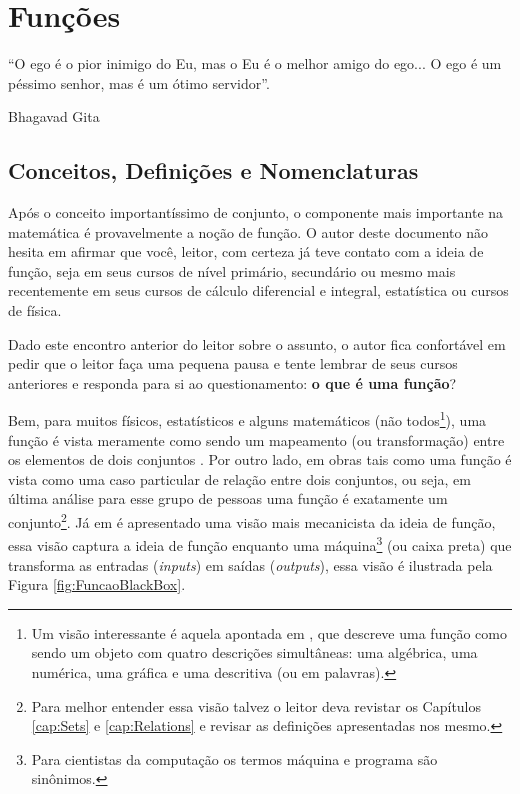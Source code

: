 \chapter{Funções}\label{cap:Functions}

\epigraph{``O ego é o pior inimigo do Eu, mas o Eu é o melhor amigo do ego... O ego é um péssimo senhor, mas é um ótimo servidor''.}{Bhagavad Gita}

\section{Conceitos, Definições e Nomenclaturas}\label{sec:FunctionsDefinitions}

Após o conceito importantíssimo de conjunto, o componente mais importante na matemática é provavelmente a noção de função. O autor deste documento não hesita em afirmar que você, leitor, com certeza já teve contato com a ideia de função, seja em seus cursos de nível primário, secundário ou mesmo mais recentemente em seus cursos de cálculo diferencial e integral, estatística ou cursos de física.

Dado este encontro anterior do leitor sobre o assunto, o autor fica confortável em pedir que o leitor faça uma pequena pausa e tente lembrar de seus cursos anteriores e responda para si ao questionamento: \textbf{o que é uma função}?

Bem, para muitos físicos, estatísticos e alguns matemáticos (não todos\footnote{Um visão interessante é aquela apontada em \cite{levin2021}, que descreve uma função como sendo um objeto com quatro descrições simultâneas: uma algébrica, uma numérica, uma gráfica e uma descritiva (ou em palavras).}), uma função é vista meramente como sendo um mapeamento (ou transformação) entre os elementos de dois conjuntos \cite{abe1991-TC}. Por outro lado, em obras tais como \cite{sussana2010-MD, lipschutz1971-Topo, lipschutz1978-TC, lipschutz2013-MD, Gerard2021discreta} uma função é vista como uma caso particular de relação entre dois conjuntos, ou seja, em última análise para esse grupo de pessoas uma função é exatamente um conjunto\footnote{Para melhor entender essa visão talvez o leitor deva revistar os Capítulos \ref{cap:Sets} e \ref{cap:Relations} e revisar as definições apresentadas nos mesmo.}. Já em \cite{edward2019-MD, fmcbook} é apresentado uma visão mais mecanicista da ideia de função, essa visão captura a ideia de função enquanto uma máquina\footnote{Para cientistas da computação os termos máquina e programa são sinônimos.} (ou caixa preta) que transforma as entradas (\textit{inputs}) em saídas (\textit{outputs}), essa visão é ilustrada pela Figura \ref{fig:FuncaoBlackBox}. 

